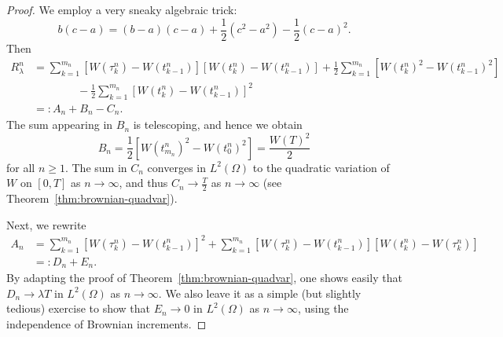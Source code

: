 \begin{proof}
    We employ a very sneaky algebraic trick:
    \begin{equation*}
        b(c-a) = (b-a)(c-a) + \frac{1}{2}(c^2-a^2) - \frac{1}{2}(c-a)^2.
    \end{equation*}
    Then
    \begin{align*}
        R_\lambda^n &= \sum_{k=1}^{m_n}[W(\tau_k^n)-W(t_{k-1}^n)][W(t_k^n)-W(t_{k-1}^n)] + \frac{1}{2}\sum_{k=1}^{m_n} [W(t_k^n)^2-W(t_{k-1}^n)^2] \\
        &\qquad\qquad -\frac{1}{2}\sum_{k=1}^{m_n}[W(t_k^n)-W(t_{k-1}^n)]^2 \\
        &=: A_n + B_n - C_n.
    \end{align*}
    The sum appearing in $B_n$ is telescoping, and hence we obtain
    \begin{equation*}
        B_n = \frac{1}{2}[W(t^n_{m_n})^2 - W(t^n_0)^2] = \frac{W(T)^2}{2}
    \end{equation*}
    for all $n\ge 1$. The sum in $C_n$ converges in $L^2(\Omega)$ to the quadratic variation of $W$ on $[0,T]$ as $n\to\infty$, and thus $C_n \to \frac{T}{2}$ as $n\to\infty$ (see Theorem~\ref{thm:brownian-quadvar}).

    Next, we rewrite
    \begin{align*}
        A_n &= \sum_{k=1}^{m_n} [W(\tau_k^n)-W(t_{k-1}^n)]^2 + \sum_{k=1}^{m_n} [W(\tau_k^n)-W(t_{k-1}^n)][W(t_k^n)-W(\tau_k^n)] \\
        &=: D_n + E_n.
    \end{align*}
    By adapting the proof of Theorem~\ref{thm:brownian-quadvar}, one shows easily that $D_n\to \lambda T$ in $L^2(\Omega)$ as $n\to\infty$. We also leave it as a simple (but slightly tedious) exercise to show that $E_n\to 0$ in $L^2(\Omega)$ as $n\to\infty$, using the independence of Brownian increments.
\end{proof}

